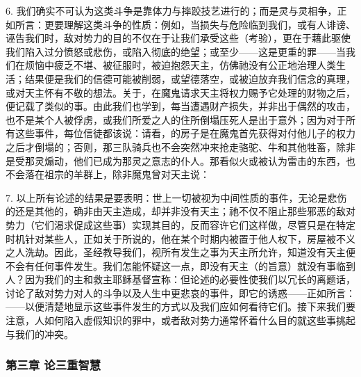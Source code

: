 6. 我们确实不可认为这类斗争是靠体力与摔跤技艺进行的；而是灵与灵相争，正如所言：更要理解这类斗争的性质：例如，当损失与危险临到我们，或有人诽谤、诬告我们时，敌对势力的目的不仅在于让我们承受这些（考验），更在于藉此驱使我们陷入过分愤怒或悲伤，或陷入彻底的绝望；或至少——这是更重的罪——当我们在烦恼中疲乏不堪、被征服时，被迫抱怨天主，仿佛祂没有公正地治理人类生活；结果便是我们的信德可能被削弱，或望德落空，或被迫放弃我们信念的真理，或对天主怀有不敬的想法。关于，在魔鬼请求天主将权力赐予它处理的财物之后，便记载了类似的事。由此我们也学到，每当遭遇财产损失，并非出于偶然的攻击，也不是某个人被俘虏，或我们所爱之人的住所倒塌压死人是出于意外；因为对于所有这些事件，每位信徒都该说：请看，的房子是在魔鬼首先获得对付他儿子的权力之后才倒塌的；否则，那三队骑兵也不会突然冲来抢走骆驼、牛和其他牲畜，除非是受那灵煽动，他们已成为那灵之意志的仆人。那看似火或被认为雷击的东西，也不会落在祖宗的羊群上，除非魔鬼曾对天主说：\par

7. 以上所有论述的结果是要表明：世上一切被视为中间性质的事件，无论是悲伤的还是其他的，确非由天主造成，却并非没有天主；祂不仅不阻止那些邪恶的敌对势力（它们渴求促成这些事）实现其目的，反而容许它们这样做，尽管只是在特定时机针对某些人，正如关于所说的，他在某个时期内被置于他人权下，房屋被不义之人洗劫。因此，圣经教导我们，视所有发生之事为天主所允许，知道没有天主便不会有任何事件发生。我们怎能怀疑这一点，即没有天主（的旨意）就没有事临到人？因为我们的主和救主耶稣基督宣称：但论述的必要性使我们以冗长的离题话，讨论了敌对势力对人的斗争以及人生中更悲哀的事件，即它的诱惑——正如所言：——以便清楚地显示这些事件发生的方式以及我们应如何看待它们。接下来我们要注意，人如何陷入虚假知识的罪中，或者敌对势力通常怀着什么目的就这些事挑起与我们的冲突。\par


\subsubsection{第三章 论三重智慧}

